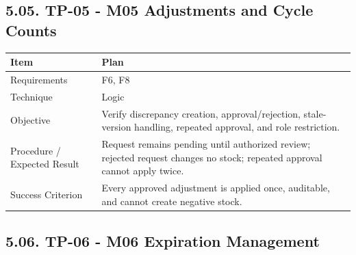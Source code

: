 \subsection{5.05. TP-05 - M05 Adjustments and Cycle Counts}\label{tp-05---m05-adjustments-and-cycle-counts}

{\def\LTcaptype{none} %
\begin{longtable}[]{|
  >{\raggedright\arraybackslash}m{}|
  >{\raggedright\arraybackslash}m{}|}
\hline
\begin{minipage}[c]{\linewidth}\raggedright
\textbf{Item}
\end{minipage} & \begin{minipage}[c]{\linewidth}\raggedright
\textbf{Plan}
\end{minipage} \\
\hline
\endhead

\endlastfoot
Requirements & F6, F8 \\ \hline
Technique & Logic \\ \hline
Objective & Verify discrepancy creation, approval/rejection, stale-version handling, repeated approval, and role restriction. \\ \hline
Procedure / Expected Result & Request remains pending until authorized review; rejected request changes no stock; repeated approval cannot apply twice. \\ \hline
Success Criterion & Every approved adjustment is applied once, auditable, and cannot create negative stock. \\ \hline
\end{longtable}
}

\subsection{5.06. TP-06 - M06 Expiration Management}\label{tp-06---m06-expiration-management}

